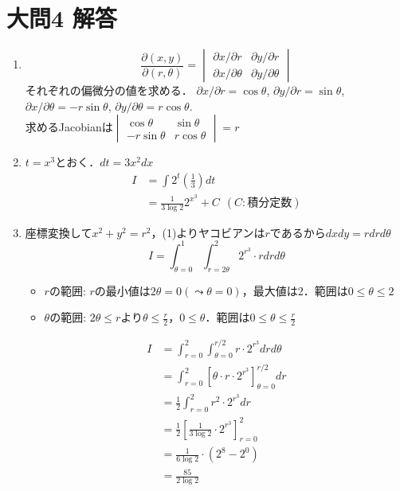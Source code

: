 \documentclass[dvipdfmx]{jsreport}
\begin{document}
\section{大問4 解答}
\begin{souanswer} %
\begin{enumerate}
	\item 
\begin{equation*}
	\frac{\partial (x, y)}{\partial (r, \theta)}= \begin{vmatrix}{\partial x}/{\partial r}& {\partial y}/{\partial r}\\ {\partial x}/{\partial \theta}& {\partial y}/{\partial \theta}\end{vmatrix}
\end{equation*}
	それぞれの偏微分の値を求める．
	${\partial x}/{\partial r}= \cos{\theta}$, 
	${\partial y}/{\partial r}= \sin{\theta}$, 
	${\partial x}/{\partial \theta}= -r\sin{\theta}$, 
	${\partial y}/{\partial \theta}= r\cos{\theta}$.\\
	求めるJacobianは$\begin{vmatrix}\cos{\theta}& \sin{\theta}\\ -r\sin{\theta}& r\cos{\theta}\end{vmatrix}= r$

	\item $t= x^3$とおく．$dt= 3x^2 dx$
\begin{align*}
	I
	&= \int 2^t \left(\frac{1}{3}\right) dt\\
	&= \frac{1}{3\log{2}} 2^{x^3}+ C\ \ (C:積分定数)
\end{align*}

	\item 座標変換して$x^2+ y^2= r^2$，(1)よりヤコビアンは$r$であるから$dxdy= r drd\theta$
\begin{equation*}
	I= \int_{\theta= 0}^1 \int_{r= 2\theta}^2 2^{r^3}\cdot rdrd\theta
\end{equation*}

\begin{tcolorbox}
\begin{itemize}
	\item $r$の範囲: $r$の最小値は$2\theta= 0(\leadsto \theta= 0)$，最大値は2．範囲は$0\le \theta\le 2$
	\item $\theta$の範囲: $2\theta\le r$より$\theta\le \frac{r}{2}$，$0\le \theta$．範囲は$0\le \theta\le \frac{r}{2}$
\end{itemize}
\end{tcolorbox}
\begin{align*}
	I
	&= \int_{r= 0}^2\int_{\theta= 0}^{r/2} r\cdot 2^{r^3}drd\theta\\
	&= \int_{r= 0}^2\left[\theta\cdot r\cdot 2^{r^3}\right]_{\theta= 0}^{r/2}dr\\
	&= \frac{1}{2}\int_{r= 0}^2 r^2\cdot 2^{r^3}dr\\
	&= \frac{1}{2}\left[\frac{1}{3\log{2}}\cdot 2^{r^3}\right]_{r= 0}^2\\
	&= \frac{1}{6\log{2}}\cdot (2^8- 2^0)\\
	&= \frac{85}{2\log{2}}
\end{align*}
\end{enumerate}
\end{souanswer}
\end{document}
